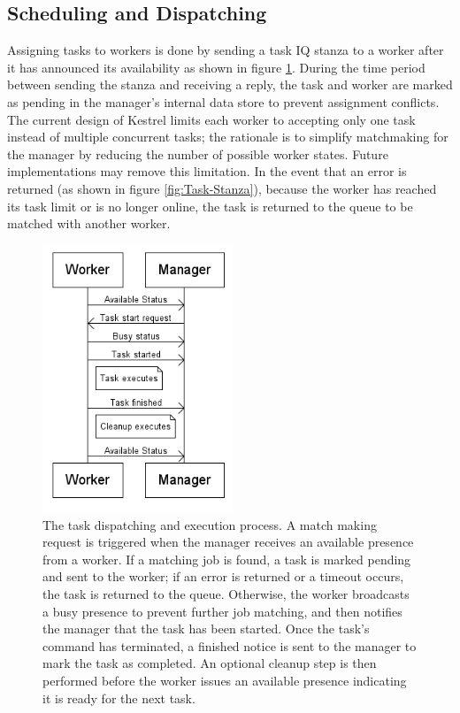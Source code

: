 \subsection{Scheduling and Dispatching}

\label{sec:Task-Dispatch} Assigning tasks to workers is done
by sending a task IQ stanza to a worker after it has announced its
availability as shown in figure \ref{fig:Task-dispatching}. During
the time period between sending the stanza and receiving a reply,
the task and worker are marked as pending in the manager's internal
data store to prevent assignment conflicts. The current design of
Kestrel limits each worker to accepting only one task instead of multiple
concurrent tasks; the rationale is to simplify matchmaking for the
manager by reducing the number of possible worker states. Future implementations
may remove this limitation. In the event that an error is returned
(as shown in figure \ref{fig:Task-Stanza}), because the worker has
reached its task limit or is no longer online, the task is returned
to the queue to be matched with another worker.

%
\begin{figure}
\begin{center}
\includegraphics[height=8cm]{figures/dispatch}
\end{center}
\caption{\label{fig:Task-dispatching}The task dispatching and execution process.
A match making request is triggered when the manager receives an available
presence from a worker. If a matching job is found, a task is marked
pending and sent to the worker; if an error is returned or a timeout
occurs, the task is returned to the queue. Otherwise, the worker broadcasts
a busy presence to prevent further job matching, and then notifies
the manager that the task has been started. Once the task's command
has terminated, a finished notice is sent to the manager to mark the
task as completed. An optional cleanup step is then performed before
the worker issues an available presence indicating it is ready for
the next task.}
\end{figure}

